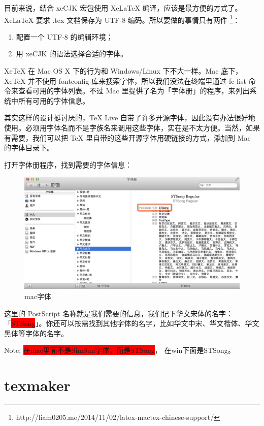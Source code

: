 目前来说，结合 xeCJK 宏包使用 XeLaTeX 编译，应该是最方便的方式了。 XeLaTeX 要求 .tex 文档保存为 UTF-8 编码。所以要做的事情只有两件 \footnote{http://liam0205.me/2014/11/02/latex-mactex-chinese-support/}：

\begin{enumerate}
	\item 配置一个 UTF-8 的编辑环境；
    \item 用 xeCJK 的语法选择合适的字体。
\end{enumerate}

XeTeX 在 Mac OS X 下的行为和 Windows/Linux 下不大一样。Mac 底下，XeTeX 并不使用 fontconfig 库来搜索字体，所以我们没法在终端里通过 fc-list 命令来查看可用的字体列表。不过 Mac 里提供了名为「字体册」的程序，来列出系统中所有可用的字体信息。

其实这样的设计挺讨厌的，TeX Live 自带了许多开源字体，因此没有办法很好地使用。必须用字体名而不是字族名来调用这些字体，实在是不太方便。当然，如果有需要，我们可以把 TeX 里自带的这些开源字体用硬链接的方式，添加到 Mac 的字体目录下。

打开字体册程序，找到需要的字体信息：

\begin{figure}
	\includegraphics{chapter/CL_fig/mac字体}
	\caption{mac字体}
\end{figure}

这里的 PostScript 名称就是我们需要的信息，我们记下华文宋体的名字：「\colorbox{red}{STSong}」。你还可以按需找到其他字体的名字，比如华文中宋、华文楷体、华文黑体等字体的名字。

Note: \colorbox{red}{在mac里面不是SimSun字体，而是STSong}， 在win下面是STSong。


\section{texmaker}

